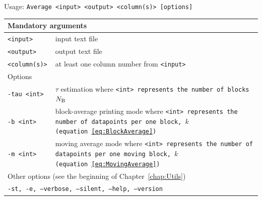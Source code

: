 \vspace{1em}
\noindent
Usage: \tt{Average <input> <output> <column(s)>  [options]}
\noindent
\begin{longtable}{p{}p{}}
  \toprule
  \multicolumn{2}{l}{Mandatory arguments} \\
  \midrule
  \tt{<input>}     & input text file\\
  \tt{<output>}    & output text file\\
  \tt{<column(s)>} & at least one column number from \tt{<input>}\\
  \midrule
  \midrule
  \multicolumn{2}{l}{Options}\\
  \midrule
  \tt{-tau <int>} & $\tau$ estimation where \tt{<int>} represents the number of
                    blocks $N_{\mathrm{B}}$ \\
  \tt{-b <int>}   & block-average printing mode where \tt{<int>} represents
                    the number of datapoints per one block, $k$
                    (equation~\eqref{eq:BlockAverage})\\
  \tt{-m <int>}   & moving average mode where \tt{<int>} represents the number
                    of datapoints per one moving block, $k$
                    (equation~\eqref{eq:MovingAverage})\\
  \midrule
  \multicolumn{2}{l}{Other options (see the beginning of 
                     Chapter~\ref{chap:Utils})}\\
  \midrule
  \multicolumn{2}{l}{\tt{-st},
                     \tt{-e},
                     \tt{--verbose},
                     \tt{--silent},
                     \tt{--help},
                     \tt{--version}}\\
  \bottomrule
\end{longtable}
